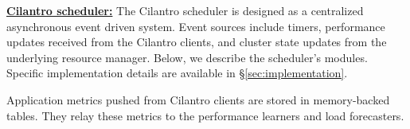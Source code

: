 

\label{sec:design:cilantroscheduler}

\textbf{\underline{Cilantro scheduler:}}
The Cilantro scheduler is designed as a centralized asynchronous event driven system.
Event sources include timers, performance updates received from the Cilantro clients, and
cluster state updates from the underlying resource manager.
Below, we describe the scheduler's modules.
Specific implementation details are
available in \S\ref{sec:implementation}. 

Application metrics pushed from Cilantro clients are stored in memory-backed tables.
They relay these metrics to the performance learners and load forecasters.

